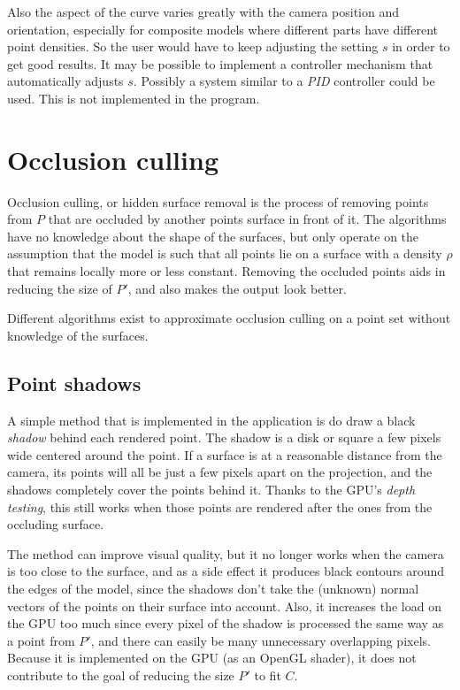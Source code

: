 \documentclass[a4paper,10pt,abstracton,notitlepage]{scrreprt}
\begin{document}
Also the aspect of the curve varies greatly with the camera position and orientation, especially for composite models where different parts have different point densities. So the user would have to keep adjusting the setting $s$ in order to get good results. It may be possible to implement a controller mechanism that automatically adjusts $s$. Possibly a system similar to a \emph{PID} controller could be used. This is not implemented in the program.




\section{Occlusion culling}
Occlusion culling, or hidden surface removal is the process of removing points from $P$ that are occluded by another points surface in front of it. The algorithms have no knowledge about the shape of the surfaces, but only operate on the assumption that the model is such that all points lie on a surface with a density $\rho$ that remains locally more or less constant. Removing the occluded points aids in reducing the size of $P'$, and also makes the output look better.

Different algorithms exist to approximate occlusion culling on a point set without knowledge of the surfaces.

\subsection{Point shadows}
A simple method that is implemented in the application is do draw a black \emph{shadow} behind each rendered point. The shadow is a disk or square a few pixels wide centered around the point. If a surface is at a reasonable distance from the camera, its points will all be just a few pixels apart on the projection, and the shadows completely cover the points behind it. Thanks to the GPU's \emph{depth testing}, this still works when those points are rendered after the ones from the occluding surface.

The method can improve visual quality, but it no longer works when the camera is too close to the surface, and as a side effect it produces black contours around the edges of the model, since the shadows don't take the (unknown) normal vectors of the points on their surface into account. Also, it increases the load on the GPU too much since every pixel of the shadow is processed the same way as a point from $P'$, and there can easily be many unnecessary overlapping pixels. Because it is implemented on the GPU (as an OpenGL shader), it does not contribute to the goal of reducing the size $P'$ to fit $C$.
\end{document}
